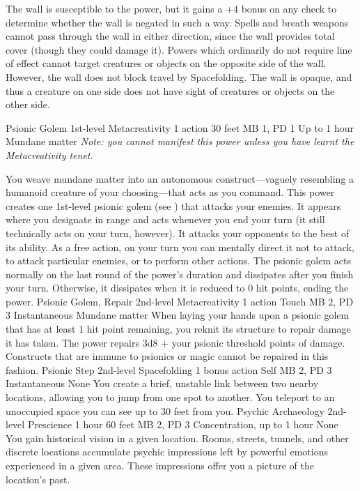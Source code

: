 The wall is susceptible to the  power,
but it gains a +4 bonus on any check to determine whether
the wall is negated in such a way. Spells and breath weapons
cannot pass through the wall in either direction, since the
wall provides total cover (though they could damage it). Powers
which ordinarily do not require line of effect cannot target
creatures or objects on the opposite side of the wall. However,
the wall does not block travel by Spacefolding. The wall is
opaque, and thus a creature on one side does not have sight
of creatures or objects on the other side.

\DndPowerHeader%
    {Psionic Golem\label{pwr:psionic_golem}}
    {1st-level Metacreativity}
    {1 action}
    {30 feet}
    {MB 1, PD 1}
    {Up to 1 hour}
    {Mundane matter}
\textit{Note: you cannot manifest this power
unless you have learnt the  Metacreativity tenet.}

You weave mundane matter into an autonomous construct---vaguely
resembling a humanoid creature of your choosing---that acts as you command.
This power creates one 1st-level psionic golem
(see )
that attacks your enemies. It appears where you designate
in range and acts whenever you end your turn (it still technically
acts on your turn, however). It attacks your opponents to
the best of its ability. As a free action, on your turn you can mentally
direct it not to attack, to attack particular enemies, or
to perform other actions. The psionic golem acts normally
on the last round of the power's duration and dissipates
after you finish your turn. Otherwise, it dissipates when
it is reduced to 0 hit points, ending the power.
\DndPowerHeader%
    {Psionic Golem, Repair\label{pwr:psionic_golem_repair}}
    {2nd-level Metacreativity}
    {1 action}
    {Touch}
    {MB 2, PD 3}
    {Instantaneous}
    {Mundane matter}
When laying your hands upon a psionic golem
that has at least 1 hit point remaining, you reknit its structure
to repair damage it has taken. The power repairs 3d8 + your psionic
threshold points of damage. Constructs that
are immune to psionics or magic cannot be repaired in this
fashion.
\DndPowerHeader%
    {Psionic Step\label{pwr:psionic_step}}
    {2nd-level Spacefolding}
    {1 bonus action}
    {Self}
    {MB 2, PD 3}
    {Instantaneous}
    {None}
You create a brief, unstable link between
two nearby locations, allowing you to jump from one spot to
another. You teleport to an unoccupied space you can see up
to 30 feet from you.
\DndPowerHeader%
    {Psychic Archaeology\label{pwr:psychic_archaeology}}
    {2nd-level Prescience}
    {1 hour}
    {60 feet}
    {MB 2, PD 3}
    {Concentration, up to 1 hour}
    {None}
You gain historical vision in a given location.
Rooms, streets, tunnels, and other discrete locations accumulate
psychic impressions left by powerful emotions experienced
in a given area. These impressions offer you a picture of
the location's past.

